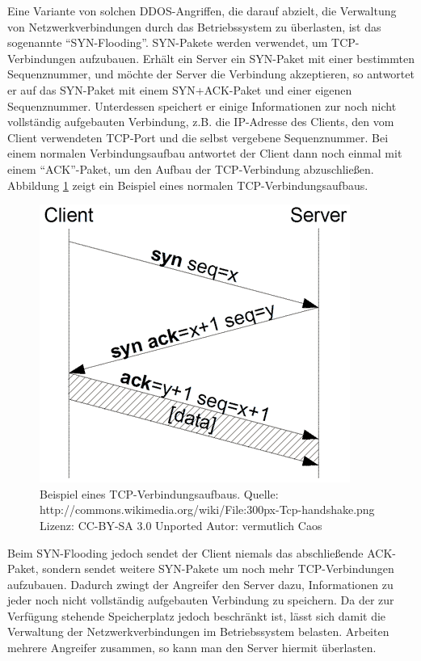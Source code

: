 Eine Variante von solchen DDOS-Angriffen, die darauf abzielt, die Verwaltung von Netzwerkverbindungen durch das Betriebssystem zu überlasten, ist das sogenannte "`SYN-Flooding"'.
SYN-Pakete werden verwendet, um TCP-Verbindungen aufzubauen.
Erhält ein Server ein SYN-Paket mit einer bestimmten Sequenznummer, und möchte der Server die Verbindung akzeptieren, so antwortet er auf das SYN-Paket mit einem SYN+ACK-Paket und einer eigenen Sequenznummer. Unterdessen speichert er einige Informationen zur noch nicht vollständig aufgebauten Verbindung, z.B. die IP-Adresse des Clients, den vom Client verwendeten TCP-Port und die selbst vergebene Sequenznummer.
Bei einem normalen Verbindungsaufbau antwortet der Client dann noch einmal mit einem "`ACK"'-Paket, um den Aufbau der TCP-Verbindung abzuschließen. Abbildung \ref{fig:impl:TcpHandshake} zeigt ein Beispiel eines normalen TCP-Verbindungsaufbaus.

\begin{figure}[htbp]
	\begin{center}
		\includegraphics[scale=0.5]{images/300px-Tcp-handshake.png}
	\end{center}
	\caption{Beispiel eines TCP-Verbindungsaufbaus. Quelle: http://commons.wikimedia.org/wiki/File:300px-Tcp-handshake.png Lizenz: CC-BY-SA 3.0 Unported Autor: vermutlich Caos}
	\label{fig:impl:TcpHandshake}
\end{figure}

Beim SYN-Flooding jedoch sendet der Client niemals das abschließende ACK-Paket, sondern sendet weitere SYN-Pakete um noch mehr TCP-Verbindungen aufzubauen.
Dadurch zwingt der Angreifer den Server dazu, Informationen zu jeder noch nicht vollständig aufgebauten Verbindung zu speichern.
Da der zur Verfügung stehende Speicherplatz jedoch beschränkt ist, lässt sich damit die Verwaltung der Netzwerkverbindungen im Betriebssystem belasten. Arbeiten mehrere Angreifer zusammen, so kann man den Server hiermit überlasten.

